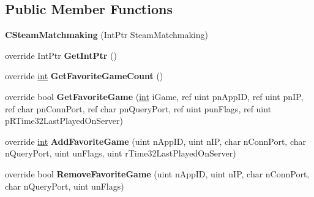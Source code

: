 \subsection*{Public Member Functions}
\begin{DoxyCompactItemize}
\item 
\hypertarget{classValve_1_1Steamworks_1_1CSteamMatchmaking_aea82a7753a0a1334de2af3352c793643}{}{\bfseries C\+Steam\+Matchmaking} (Int\+Ptr Steam\+Matchmaking)\label{classValve_1_1Steamworks_1_1CSteamMatchmaking_aea82a7753a0a1334de2af3352c793643}

\item 
\hypertarget{classValve_1_1Steamworks_1_1CSteamMatchmaking_afab5e59db8abb3856457c6e4878c2fdd}{}override Int\+Ptr {\bfseries Get\+Int\+Ptr} ()\label{classValve_1_1Steamworks_1_1CSteamMatchmaking_afab5e59db8abb3856457c6e4878c2fdd}

\item 
\hypertarget{classValve_1_1Steamworks_1_1CSteamMatchmaking_ad928375603ad6b97d535e3f95e27c6c3}{}override \hyperlink{SDL__thread_8h_a6a64f9be4433e4de6e2f2f548cf3c08e}{int} {\bfseries Get\+Favorite\+Game\+Count} ()\label{classValve_1_1Steamworks_1_1CSteamMatchmaking_ad928375603ad6b97d535e3f95e27c6c3}

\item 
\hypertarget{classValve_1_1Steamworks_1_1CSteamMatchmaking_a5e2d3d8032f2c60e4e956285fb90aa36}{}override bool {\bfseries Get\+Favorite\+Game} (\hyperlink{SDL__thread_8h_a6a64f9be4433e4de6e2f2f548cf3c08e}{int} i\+Game, ref uint pn\+App\+I\+D, ref uint pn\+I\+P, ref char pn\+Conn\+Port, ref char pn\+Query\+Port, ref uint pun\+Flags, ref uint p\+R\+Time32\+Last\+Played\+On\+Server)\label{classValve_1_1Steamworks_1_1CSteamMatchmaking_a5e2d3d8032f2c60e4e956285fb90aa36}

\item 
\hypertarget{classValve_1_1Steamworks_1_1CSteamMatchmaking_af53d78402f229f501d1fa06762b92a68}{}override \hyperlink{SDL__thread_8h_a6a64f9be4433e4de6e2f2f548cf3c08e}{int} {\bfseries Add\+Favorite\+Game} (uint n\+App\+I\+D, uint n\+I\+P, char n\+Conn\+Port, char n\+Query\+Port, uint un\+Flags, uint r\+Time32\+Last\+Played\+On\+Server)\label{classValve_1_1Steamworks_1_1CSteamMatchmaking_af53d78402f229f501d1fa06762b92a68}

\item 
\hypertarget{classValve_1_1Steamworks_1_1CSteamMatchmaking_ad3025c4df9af14701ee4e517ed3a59c2}{}override bool {\bfseries Remove\+Favorite\+Game} (uint n\+App\+I\+D, uint n\+I\+P, char n\+Conn\+Port, char n\+Query\+Port, uint un\+Flags)\label{classValve_1_1Steamworks_1_1CSteamMatchmaking_ad3025c4df9af14701ee4e517ed3a59c2}


\end{DoxyCompactItemize}
